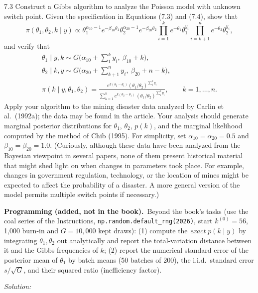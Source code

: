 \documentclass[11pt,a4paper]{article}
\newif\ifsolucoes
\newcommand{\espacoresol}{4.5cm}   %
\numberwithin{equation}{questao}   %
\newcommand{\programacao}{\par\smallskip\noindent\textbf{Programming (added, not in the book).}~}
\newcommand{\resolespaco}{\ifsolucoes\else\par\textit{Solution:}\vspace{\espacoresol}\par\fi}
\newcommand{\1}{\mathbf{1}}
\begin{document}
7.3 Construct a Gibbs algorithm to analyze the Poisson model with unknown switch point. Given the
specification in Equations (7.3) and (7.4), show that
\[
\pi(\theta_1,\theta_2,k\mid y)\propto\theta_1^{\alpha_{10}-1}e^{-\beta_{10}\theta_1}\theta_2^{\alpha_{20}-1}e^{-\beta_{20}\theta_2}
\prod_{i=1}^{k}e^{-\theta_1}\theta_1^{y_i}\prod_{i=k+1}^{n}e^{-\theta_2}\theta_2^{y_i},
\]
and verify that
\begin{gather*}
\theta_1\mid y,k\sim G\Big(\alpha_{10}+\sum_{1}^{k}y_i,\ \beta_{10}+k\Big),\\
\theta_2\mid k,y\sim G\Big(\alpha_{20}+\sum_{k+1}^{n}y_i,\ \beta_{20}+n-k\Big),\\
\pi(k\mid y,\theta_1,\theta_2)=\frac{e^{k(\theta_2-\theta_1)}(\theta_1/\theta_2)^{\sum_1^ky_i}}
{\sum_{k=1}^{n}e^{k(\theta_2-\theta_1)}\,(\theta_1/\theta_2)^{\sum_1^ky_i}},\qquad k=1,\dots,n.
\end{gather*}
Apply your algorithm to the mining disaster data analyzed by Carlin et al.\ (1992a); the data may be
found in the article. Your analysis should generate marginal posterior distributions for
$\theta_1$, $\theta_2$, $p(k)$, and the marginal likelihood computed by the method of Chib (1995).
For simplicity, set $\alpha_{10}=\alpha_{20}=0.5$ and $\beta_{10}=\beta_{20}=1.0$. (Curiously,
although these data have been analyzed from the Bayesian viewpoint in several papers, none of them
present historical material that might shed light on when changes in parameters took place. For
example, changes in government regulation, technology, or the location of mines might be expected
to affect the probability of a disaster. A more general version of the model permits multiple
switch points if necessary.)
\programacao Beyond the book's tasks (use the coal series of the Instructions,
\texttt{np.random.default\_rng(2026)}, start $k^{(0)}=56$, 1{,}000 burn-in and $G=10{,}000$ kept
draws): (1) compute the \emph{exact} $p(k\mid y)$ by integrating $\theta_1,\theta_2$ out analytically
and report the total-variation distance between it and the Gibbs frequencies of $k$; (2) report the
numerical standard error of the posterior mean of $\theta_1$ by batch means (50 batches of 200),
the i.i.d.\ standard error $s/\sqrt G$, and their squared ratio (inefficiency factor).
\resolespaco
\end{document}
